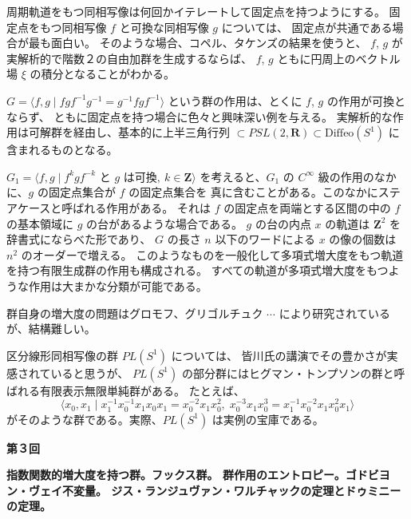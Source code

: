\documentclass[uplatex,dvipdfmx]{jlreq}
\begin{document}
周期軌道をもつ同相写像は何回かイテレートして固定点を持つようにする。
固定点をもつ同相写像 $f$ と可換な同相写像 $g$ については、
固定点が共通である場合が最も面白い。
そのような場合、コペル、タケンズの結果を使うと、
$f$, $g$ が実解析的で階数２の自由加群を生成するならば、
$f$, $g$ ともに円周上のベクトル場 $\xi$ の積分となることがわかる。

$G = \langle f, g \mid fgf^{-1}g^{-1} = g^{-1}fgf^{-1} \rangle$
という群の作用は、とくに $f$, $g$ の作用が可換とならず、
ともに固定点を持つ場合に色々と興味深い例を与える。
実解析的な作用は可解群を経由し、基本的に上半三角行列
$\subset PSL(2, \mathbf{R}) \subset \mathrm{Diffeo}(S^1)$
に含まれるものとなる。

$G_1 = \langle f, g \mid f^k g f^{-k} \text{ と } g \text{ は可換},\ k \in \mathbf{Z} \rangle$
を考えると、$G_1$ の $C^\infty$ 級の作用のなかに、$g$ の固定点集合が $f$ の固定点集合を
真に含むことがある。このなかにステアケースと呼ばれる作用がある。
それは $f$ の固定点を両端とする区間の中の $f$ の基本領域に $g$ の台があるような場合である。
$g$ の台の内点 $x$ の軌道は $\mathbf{Z}^2$ を辞書式にならべた形であり、
$G$ の長さ $n$ 以下のワードによる $x$ の像の個数は $n^2$ のオーダーで増える。
このようなものを一般化して多項式増大度をもつ軌道を持つ有限生成群の作用も構成される。
すべての軌道が多項式増大度をもつような作用は大まかな分類が可能である。

群自身の増大度の問題はグロモフ、グリゴルチュク $\cdots$ により研究されているが、結構難しい。

区分線形同相写像の群 $PL(S^1)$ については、
皆川氏の講演でその豊かさが実感されていると思うが、
$PL(S^1)$ の部分群にはヒグマン・トンプソンの群と呼ばれる有限表示無限単純群がある。
たとえば、
\[
  \langle x_0, x_1 \mid
  x_1^{-1} x_0^{-1} x_1 x_0 x_1 = x_0^{-2} x_1 x_0^2,\;
  x_0^{-3} x_1 x_0^3 = x_1^{-1} x_0^{-2} x_1 x_0^2 x_1 \rangle
\]
がそのような群である。実際、$PL(S^1)$ は実例の宝庫である。

\bigskip
\noindent
{\large\textbf{第３回}}

\medskip
\noindent
\textbf{指数関数的増大度を持つ群。フックス群。
群作用のエントロピー。ゴドビヨン・ヴェイ不変量。
ジス・ランジュヴァン・ワルチャックの定理とドゥミニーの定理。}

\medskip
\end{document}
